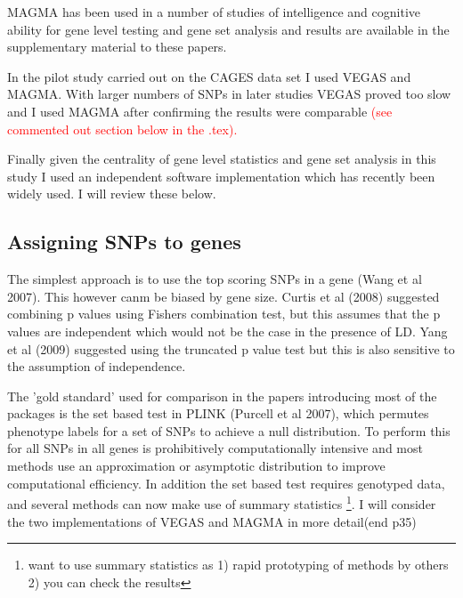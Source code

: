 MAGMA has been used in a number of studies of intelligence and cognitive ability for gene level testing and gene set analysis and results are available in the supplementary material to these papers.

In the pilot study carried out on the CAGES data set I used VEGAS and MAGMA. With larger numbers of SNPs in later studies VEGAS proved too slow and I used MAGMA after confirming the results were comparable \textcolor{red}{(see commented out section below in the .tex).} 

Finally given the centrality of gene level statistics and gene set analysis in this study I used an independent software implementation which has recently been widely used. I will review these below. 




\subsection{Assigning SNPs to genes}

The simplest approach is to use the top scoring SNPs in a gene (Wang et al 2007). This however canm be biased by gene size. Curtis et al (2008) suggested combining p values using Fishers combination test, but this assumes that the p values are independent which would not be the case in the presence of LD. Yang et al (2009)
suggested using the truncated p value test but this is also sensitive to the assumption of independence. 

The 'gold standard' used for comparison in the papers introducing most of the packages is the set based test in PLINK (Purcell et al 2007), which permutes phenotype labels for a set of SNPs to achieve a null distribution. To perform this for all SNPs in all genes is prohibitively computationally intensive and most methods use an approximation or asymptotic distribution to improve computational efficiency. In addition the set based test requires genotyped data, and several methods can now make use of summary statistics \footnote{want to use summary statistics as 1) rapid prototyping of methods by others 2) you can check the results}. I will consider the two implementations of VEGAS and MAGMA in more detail(end p35)

